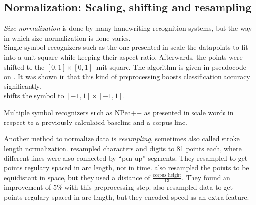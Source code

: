 \subsection{Normalization: Scaling, shifting and resampling}
\textit{Size normalization} is done by many handwriting recognition systems, but
the way in which size normalization is done varies.\\
Single symbol recognizers such as the one presented in \cite{Kirsch} scale the
datapoints to fit into a unit square while
keeping their aspect ratio. Afterwards, the points were shifted to
the $[0, 1] \times [0, 1]$ unit square. The algorithm is given in pseudocode on
. It was shown in \cite{Kirsch,Huang09} that
this kind of preprocessing boosts classification accuracy significantly.\\
\cite{Guyon91} shifts the symbol to $[-1, 1] \times [-1, 1]$.

Multiple symbol recognizers such as NPen++ as presented in \cite{Manke01}
scale words in respect to a previously calculated baseline and a corpus line.

Another method to normalize data is \textit{resampling}, sometimes also called
stroke length normalization.
\cite{Guyon91} resampled characters and digits to 81 points each, where different
lines were also connected by \enquote{pen-up} segments. They resampled to get
points regulary spaced in arc length, not in time. \cite{Manke01} also resampled
the points to be equidistant in space, but they used a distance of $\frac{\text{corpus height}}{13}$.
They found an improvement of $5\%$ with this preprocessing step.
\cite{ICASSP-94} also resampled data to get points regulary spaced in arc length, but they encoded
speed as an extra feature.

